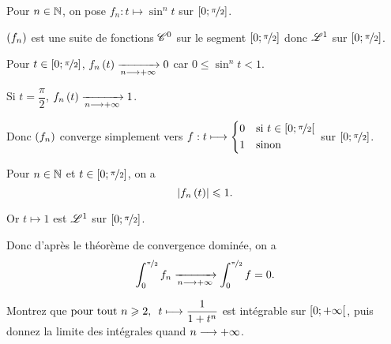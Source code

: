 \begin{corr}
Pour \(n\in\mathbb{N}\), on pose \(f_n:t\mapsto\sin^nt\) sur \(\left[0;\nicefrac{\pi}{2}\right]\).

\(\left(f_n\right)\) est une suite de fonctions \(\mathscr{C}^{0}\) sur le segment \(\left[0;\nicefrac{\pi}{2}\right]\) donc \(\integ{1}{}{}\) sur \(\left[0;\nicefrac{\pi}{2}\right]\).

Pour \(t\in\left[0;\nicefrac{\pi}{2}\right]\), \(f_n\left(t\right)\xrightarrow[n\longrightarrow+\infty]{}0\) car \(0\leq\sin^nt<1\).

Si \(t=\dfrac{\pi}{2}\), \(f_n\left(t\right)\xrightarrow[n\longrightarrow+\infty]{}1\).

Donc \(\left(f_n\right)\) converge simplement vers \(f:t\longmapsto\begin{dcases}
    0 &\text{si }t\in\left[0;\nicefrac{\pi}{2}\right[ \\
    1 &\text{sinon}
\end{dcases}\) sur \(\left[0;\nicefrac{\pi}{2}\right]\).

Pour \(n\in\mathbb{N}\) et \(t\in\left[0;\nicefrac{\pi}{2}\right]\), on a \[\left\lvert f_n\left(t\right)\right\rvert\leqslant1.\]

Or \(t\mapsto1\) est \(\integ{1}{}{}\) sur \(\left[0;\nicefrac{\pi}{2}\right]\).

Donc d'après le théorème de convergence dominée, on a \[\int_0^{\nicefrac{\pi}{2}}f_n\xrightarrow[n\longrightarrow+\infty]{}\int_0^{\nicefrac{\pi}{2}}f=0.\]
\end{corr}

\begin{exo}
Montrez que \(\quantifs{\tpt n\geq2}t\mapsto\dfrac{1}{1+t^n}\) est intégrable sur \(\left[0;+\infty\right[\), puis donnez la limite des intégrales quand \(n\longrightarrow+\infty\).
\end{exo}


